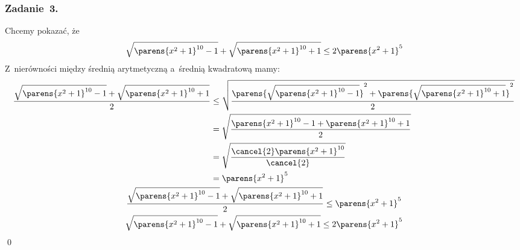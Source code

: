 \subsubsection*{Zadanie~3.}
Chcemy pokazać, że
\begin{equation*}
    \sqrt{\parens{x^2 + 1}^{10} - 1} + \sqrt{\parens{x^2 + 1}^{10} + 1} \leq 2\parens{x^2 + 1}^5
\end{equation*}
Z~nierówności między średnią arytmetyczną a~średnią kwadratową mamy:
\begin{gather*}
    \begin{split}
        \frac{\sqrt{\parens{x^2 + 1}^{10} - 1} + \sqrt{\parens{x^2 + 1}^{10} + 1}}{2} &\leq \sqrt{\frac{\parens{\sqrt{\parens{x^2 + 1}^{10} - 1}}^2 + \parens{\sqrt{\parens{x^2 + 1}^{10} + 1}}^2}{2}}\\
            &= \sqrt{\frac{\parens{x^2 + 1}^{10} - 1 + \parens{x^2 + 1}^{10} + 1}{2}}\\
            &= \sqrt{\frac{\cancel{2}\parens{x^2 + 1}^{10}}{\cancel{2}}}\\
            &= \parens{x^2 + 1}^5
    \end{split}\\
    \frac{\sqrt{\parens{x^2 + 1}^{10} - 1} + \sqrt{\parens{x^2 + 1}^{10} + 1}}{2} \leq \parens{x^2 + 1}^5\\
    \sqrt{\parens{x^2 + 1}^{10} - 1} + \sqrt{\parens{x^2 + 1}^{10} + 1} \leq 2\parens{x^2 + 1}^5
\end{gather*}
\qed
